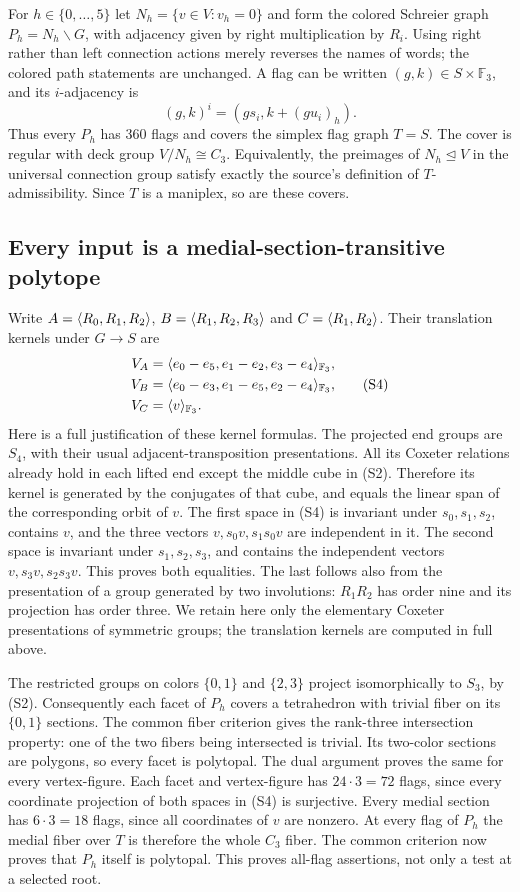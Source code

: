 For $h\in\{0,\ldots,5\}$ let $N_h=\{v\in V:v_h=0\}$ and form the
colored Schreier graph $P_h=N_h\backslash G$, with adjacency given by
right multiplication by $R_i$. Using right rather than left connection
actions merely reverses the names of words; the colored path statements
are unchanged. A flag can be written $(g,k)\in S\times\mathbb F_3$, and
its $i$-adjacency is
\[
 (g,k)^i=(gs_i,k+(g u_i)_h).                            \tag{S3}
\]
Thus every $P_h$ has $360$ flags and covers the simplex flag graph
$T=S$. The cover is regular with deck group $V/N_h\cong C_3$.
Equivalently, the preimages of $N_h\trianglelefteq V$ in the universal
connection group satisfy exactly the source's definition of
$T$-admissibility. Since $T$ is a maniplex, so are these covers.

\subsection{Every input is a medial-section-transitive polytope}
Write $A=\langle R_0,R_1,R_2\rangle$, $B=\langle R_1,R_2,R_3\rangle$ and
$C=\langle R_1,R_2\rangle$. Their translation kernels under $G\to S$ are
\[
\begin{aligned}
 V_A&=\langle e_0-e_5,e_1-e_2,e_3-e_4\rangle_{\mathbb F_3},\\
 V_B&=\langle e_0-e_3,e_1-e_5,e_2-e_4\rangle_{\mathbb F_3},\\
 V_C&=\langle v\rangle_{\mathbb F_3}.
\end{aligned} \tag{S4}
\]
Here is a full justification of these kernel formulas. The projected
end groups are $S_4$, with their usual adjacent-transposition
presentations. All its Coxeter relations already hold in each lifted
end except the middle cube in (S2). Therefore its kernel is generated
by the conjugates of that cube, and equals the linear span of the
corresponding orbit of $v$. The first space in (S4) is invariant under
$s_0,s_1,s_2$, contains $v$, and the three vectors $v,s_0v,s_1s_0v$
are independent in it. The second space is invariant under
$s_1,s_2,s_3$, and contains the independent vectors $v,s_3v,s_2s_3v$.
This proves both equalities. The last follows also from the presentation
of a group generated by two involutions: $R_1R_2$ has order nine and
its projection has order three. We retain here only the elementary
Coxeter presentations of symmetric groups; the translation kernels are
computed in full above.

The restricted groups on colors $\{0,1\}$ and $\{2,3\}$ project
isomorphically to $S_3$, by (S2). Consequently each facet of $P_h$ covers
a tetrahedron with trivial fiber on its $\{0,1\}$ sections. The common
fiber criterion gives the rank-three intersection property: one of the
two fibers being intersected is trivial. Its two-color sections are
polygons, so every facet is polytopal. The dual argument proves the same
for every vertex-figure. Each facet and vertex-figure has $24\cdot3=72$
flags, since every coordinate projection of both spaces in (S4) is
surjective. Every medial section has $6\cdot3=18$ flags, since all
coordinates of $v$ are nonzero. At every flag of $P_h$ the medial fiber
over $T$ is therefore the whole $C_3$ fiber. The common criterion now
proves that $P_h$ itself is polytopal. This proves all-flag assertions,
not only a test at a selected root.

